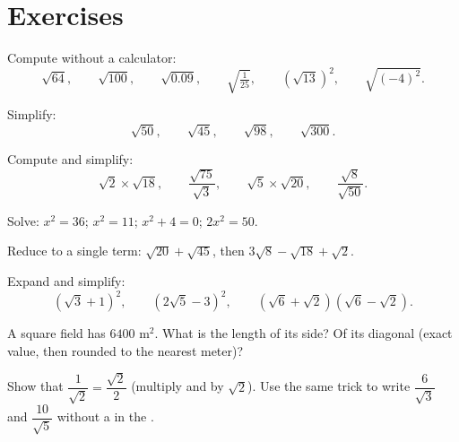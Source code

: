 \section{Exercises}

\begin{exercise}[$\star$]\label{exo:g9:sqrt:1}
Compute without a calculator:
\[
\sqrt{64}, \qquad \sqrt{100}, \qquad \sqrt{0.09}, \qquad
\sqrt{\tfrac{1}{25}}, \qquad \left(\sqrt{13}\right)^2, \qquad
\sqrt{(-4)^2} .
\]
\end{exercise}

\begin{exercise}[$\star$]\label{exo:g9:sqrt:2}
Simplify:
\[
\sqrt{50}, \qquad \sqrt{45}, \qquad \sqrt{98}, \qquad \sqrt{300} .
\]
\end{exercise}

\begin{exercise}[$\star$]\label{exo:g9:sqrt:3}
Compute and simplify:
\[
\sqrt2 \times \sqrt{18}, \qquad
\frac{\sqrt{75}}{\sqrt3}, \qquad
\sqrt5 \times \sqrt{20}, \qquad
\frac{\sqrt{8}}{\sqrt{50}} .
\]
\end{exercise}

\begin{exercise}[$\star$]\label{exo:g9:sqrt:4}
Solve: $x^2 = 36$; \quad $x^2 = 11$; \quad $x^2 + 4 = 0$; \quad
$2x^2 = 50$.
\end{exercise}

\begin{exercise}[$\star$]\label{exo:g9:sqrt:5}
Reduce to a single term: $\sqrt{20} + \sqrt{45}$, then
$3\sqrt8 - \sqrt{18} + \sqrt2$.
\end{exercise}

\begin{exercise}[$\star\star$]\label{exo:g9:sqrt:6}
Expand and simplify:
\[
\left(\sqrt3 + 1\right)^2, \qquad
\left(2\sqrt5 - 3\right)^2, \qquad
\left(\sqrt6 + \sqrt2\right)\left(\sqrt6 - \sqrt2\right).
\]
\end{exercise}

\begin{exercise}[$\star\star$]\label{exo:g9:sqrt:7}
A square field has  $6400$ m$^2$. What is the length of its side? Of
its diagonal (exact value, then rounded to the nearest meter)?
\end{exercise}

\begin{exercise}[$\star\star$]\label{exo:g9:sqrt:8}
Show that $\dfrac{1}{\sqrt2} = \dfrac{\sqrt2}{2}$ (multiply  and
 by $\sqrt2$). Use the same trick to write $\dfrac{6}{\sqrt3}$
and $\dfrac{10}{\sqrt5}$ without a  in the .
\end{exercise}

